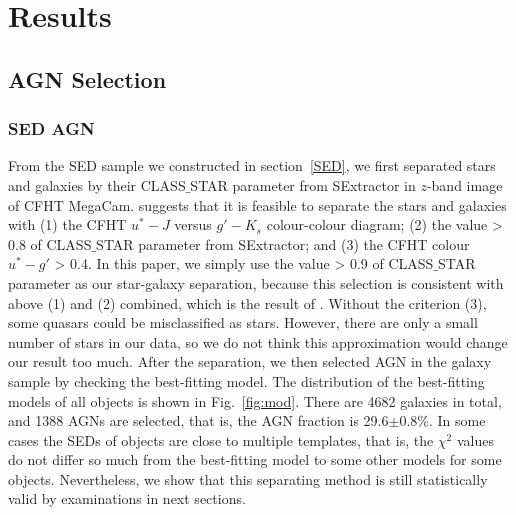 \documentclass[a4paper,fleqn,usenatbib]{mnras}
\begin{document}
\section{Results}
\label{results}
\subsection{AGN Selection}
\label{AGN}
\subsubsection{SED AGN}
\label{SED AGN}
From the SED sample we constructed in section~\ref{SED}, we first separated stars and galaxies by their CLASS$\_$STAR parameter from SExtractor in $z$-band image of CFHT MegaCam. \cite{Oi et al. 2014} suggests that it is feasible to separate the stars and galaxies with (1) the CFHT $u^*-J$ versus $g'-K_s$ colour-colour diagram; (2) the value > 0.8 of CLASS$\_$STAR parameter from SExtractor; and (3) the CFHT colour $u^*-g'$ > 0.4. In this paper, we simply use the value > 0.9 of CLASS$\_$STAR parameter as our star-galaxy separation, because this selection is consistent with above (1) and (2) combined, which is the result of \cite{Oi et al. 2014}. Without the criterion (3), some quasars could be misclassified as stars. However, there are only a small number of stars in our data, so we do not think this approximation would change our result too much. After the separation, we then selected AGN in the galaxy sample by checking the best-fitting model. The distribution of the best-fitting models of all objects is shown in Fig.~\ref{fig:mod}. There are 4682 galaxies in total, and 1388 AGNs are selected, that is, the AGN fraction is 29.6$\pm$0.8$\%$. In some cases the SEDs of objects are close to multiple templates, that is, the $\chi^2$ values do not differ so much from the best-fitting model to some other models for some objects. Nevertheless, we show that this separating method is still statistically valid by examinations in next sections.   
\end{document}

